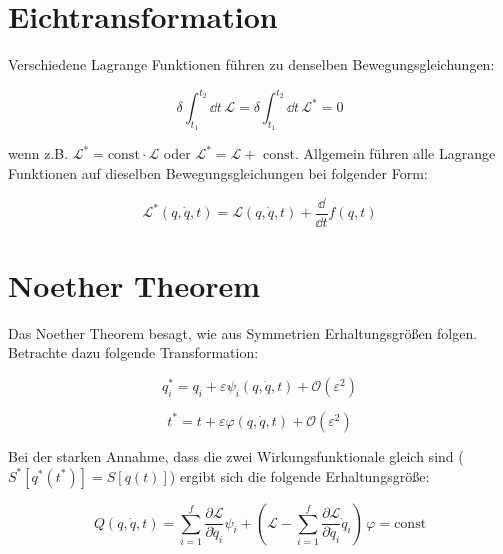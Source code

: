 \section{Eichtransformation}

\begin{framedthm}[Eichtransformation]
	
	Verschiedene Lagrange Funktionen führen zu denselben Bewegungsgleichungen:
	
	\[ \delta \int_{t_1}^{t_2} \dd t \, \mathscr{L} = \delta \int_{t_1}^{t_2} \dd t \, \mathscr{L}^* = 0 \]
	
	wenn z.B. $\mathscr{L}^* = \textrm{const} \cdot \mathscr{L}$ oder $\mathscr{L}^* = \mathscr{L} + \textrm{ const}$. Allgemein führen alle Lagrange Funktionen auf dieselben Bewegungsgleichungen bei folgender Form:
	
	\[ \mathscr{L}^*(q, \dot q, t) = \mathscr{L}(q, \dot q, t) + \frac{\dd}{\dd t} f(q,t) \]
	
\end{framedthm}

\section{Noether Theorem}

\begin{framedthm}
	
	Das Noether Theorem besagt, wie aus Symmetrien Erhaltungsgrößen folgen. Betrachte dazu folgende Transformation:
	
	\[ q_i^* = q_i + \varepsilon \psi_i(q,\dot q, t) + \mathcal{O}(\varepsilon^2) \]
	
	\[ t^* =  t + \varepsilon \varphi(q, \dot q, t) + \mathcal{O}(\varepsilon^2) \]
	
	Bei der starken Annahme, dass die zwei Wirkungsfunktionale gleich sind ($S^*[q^*(t^*)] = S[q(t)]$) ergibt sich die folgende Erhaltungsgröße:
	
	\[ Q(q,\dot q, t) = \sum_{i=1}^f \frac{\partial \mathscr{L}}{\partial \dot q_i} \psi_i + (\mathscr{L} - \sum^f_{i=1} \frac{\partial \mathscr{L}}{\partial \dot q_i} \dot q_i) \, \varphi = \textrm{const} \]
	
\end{framedthm}